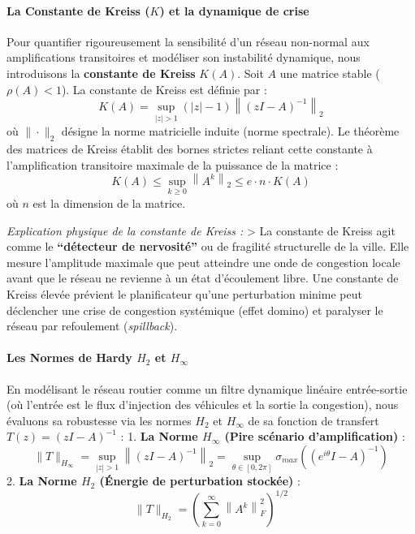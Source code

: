 \documentclass[10pt, a4paper]{article}
\begin{document}
\paragraph{\texorpdfstring{La Constante de Kreiss (\(K\)) et la
dynamique de
crise}{La Constante de Kreiss (K) et la dynamique de crise}}\label{la-constante-de-kreiss-k-et-la-dynamique-de-crise}

Pour quantifier rigoureusement la sensibilité d'un réseau non-normal aux
amplifications transitoires et modéliser son instabilité dynamique, nous
introduisons la \textbf{constante de Kreiss} \(K(A)\). Soit \(A\) une
matrice stable (\(\rho(A) < 1\)). La constante de Kreiss est définie par
: \[K(A) = \sup_{|z| > 1} (|z| - 1) \left\| (zI - A)^{-1} \right\|_2\]
où \(\|\cdot\|_2\) désigne la norme matricielle induite (norme
spectrale). Le théorème des matrices de Kreiss établit des bornes
strictes reliant cette constante à l'amplification transitoire maximale
de la puissance de la matrice :
\[K(A) \le \sup_{k \ge 0} \left\| A^k \right\|_2 \le e \cdot n \cdot K(A)\]
où \(n\) est la dimension de la matrice.

\emph{Explication physique de la constante de Kreiss :} \textgreater{}
La constante de Kreiss agit comme le \textbf{``détecteur de nervosité''}
ou de fragilité structurelle de la ville. Elle mesure l'amplitude
maximale que peut atteindre une onde de congestion locale avant que le
réseau ne revienne à un état d'écoulement libre. Une constante de Kreiss
élevée prévient le planificateur qu'une perturbation minime peut
déclencher une crise de congestion systémique (effet domino) et
paralyser le réseau par refoulement (\emph{spillback}).

\paragraph{\texorpdfstring{Les Normes de Hardy \(H_2\) et
\(H_\infty\)}{Les Normes de Hardy H\_2 et H\_\textbackslash infty}}\label{les-normes-de-hardy-h_2-et-h_infty}

En modélisant le réseau routier comme un filtre dynamique linéaire
entrée-sortie (où l'entrée est le flux d'injection des véhicules et la
sortie la congestion), nous évaluons sa robustesse via les normes
\(H_2\) et \(H_\infty\) de sa fonction de transfert
\(T(z) = (zI - A)^{-1}\) : 1. \textbf{La Norme \(H_\infty\) (Pire
scénario d'amplification)} :
\[\|T\|_{H_\infty} = \sup_{|z| > 1} \left\| (zI - A)^{-1} \right\|_2 = \sup_{\theta \in [0, 2\pi]} \sigma_{max}\left( (e^{i\theta}I - A)^{-1} \right)\]
2. \textbf{La Norme \(H_2\) (Énergie de perturbation stockée)} :
\[\|T\|_{H_2} = \left( \sum_{k=0}^{\infty} \left\| A^k \right\|_F^2 \right)^{1/2}\]
\end{document}
